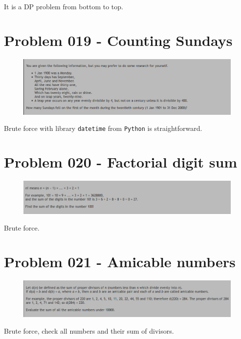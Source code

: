 \begin{sol}
It is a DP problem from bottom to top.
\end{sol}
\section{Problem 019 - Counting Sundays}
\begin{prob}
	\begin{figure}[htb!]
		\begin{center}
			\includegraphics[scale = 0.4]{pic/019.png}
		\end{center}
	\end{figure}
\end{prob}
\begin{sol}
Brute force with library \texttt{datetime} from \texttt{Python} is straightforward.
\end{sol}
\section{Problem 020 - Factorial digit sum}
\begin{prob}
	\begin{figure}[htb!]
		\begin{center}
			\includegraphics[scale = 0.4]{pic/020.png}
		\end{center}
	\end{figure}
\end{prob}
\begin{sol}
Brute force.
\end{sol}
\newpage
\section{Problem 021 -  Amicable numbers}
\begin{prob}
	\begin{figure}[htb!]
		\begin{center}
			\includegraphics[scale = 0.4]{pic/021.png}
		\end{center}
	\end{figure}
\end{prob}
\begin{sol}
Brute force, check all numbers and their sum of divisors.
\end{sol}
